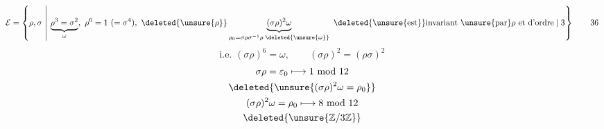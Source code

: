 \[
\mathcal E=\left\{\rho,\sigma\ \middle|\
\underbrace{\rho^3=\sigma^2}_{\omega},\ \rho^6=1\ (=\sigma^4),\
\deleted{\unsure{\rho}}\underbrace{(\sigma\rho)^2\omega}_{\rho_0=\sigma\rho\sigma^{-1}\rho\;\deleted{\unsure{\omega}}}
\ \deleted{\unsure{\text{est}}}\text{invariant}\
\unsure{\text{par}}\rho\text{ et d'ordre}\mid3\right\}
\qquad36
\]
\[
\text{i.e. }(\sigma\rho)^6=\omega,\qquad
(\sigma\rho)^2=(\rho\sigma)^2
\]
\[
\begin{gathered}
\sigma\rho=\varepsilon_0\longmapsto1\ \mathrm{mod}\ 12\\
\deleted{\unsure{(\sigma\rho)^2\omega=\rho_0}}\\
(\sigma\rho)^2\omega=\rho_0\longmapsto8\ \mathrm{mod}\ 12\\
\deleted{\unsure{\mathbb Z/3\mathbb Z}}
\end{gathered}
\]

